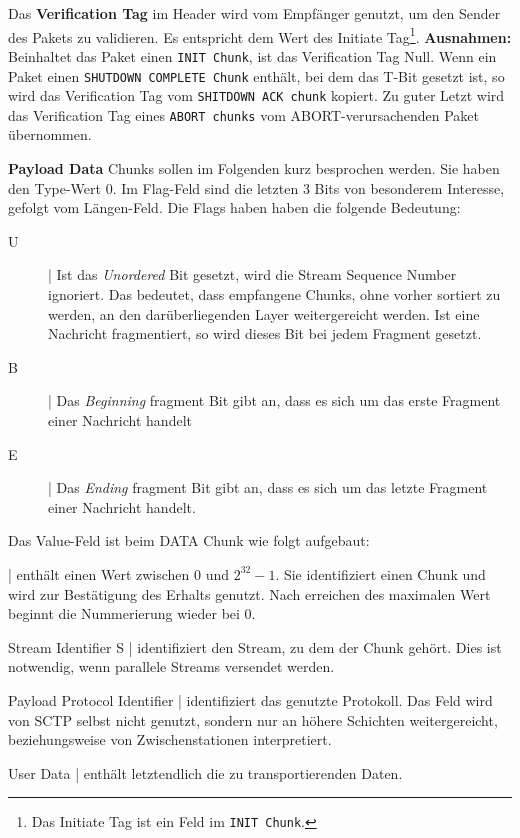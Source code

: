 \documentclass{article} %
\begin{document}
Das \textbf{Verification Tag} im Header wird vom Empfänger genutzt, um den Sender des Pakets zu validieren.
Es entspricht dem Wert des Initiate Tag\footnote{Das Initiate Tag ist ein Feld im \texttt{INIT Chunk}.}.
\textbf{Ausnahmen:} Beinhaltet das Paket einen \texttt{INIT Chunk}, ist das Verification Tag Null.
Wenn ein Paket einen \texttt{SHUTDOWN COMPLETE Chunk} enthält, bei dem das T-Bit gesetzt ist, so wird das Verification Tag vom \texttt{SHITDOWN ACK chunk} kopiert.
Zu guter Letzt wird das Verification Tag eines \texttt{ABORT chunks} vom ABORT-verursachenden Paket übernommen.

\textbf{Payload Data} Chunks sollen im Folgenden kurz besprochen werden.
Sie haben den Type-Wert 0.
Im Flag-Feld sind die letzten 3 Bits von besonderem Interesse, gefolgt vom Längen-Feld.
Die Flags haben haben die folgende Bedeutung:
\begin{description}
	\item[U] | Ist das \emph{Unordered} Bit gesetzt, wird die Stream Sequence Number ignoriert.
	Das bedeutet, dass empfangene Chunks, ohne vorher sortiert zu werden, an den darüberliegenden Layer weitergereicht werden.
	Ist eine Nachricht fragmentiert, so wird dieses Bit bei jedem Fragment gesetzt.
	\item[B] | Das \emph{Beginning} fragment Bit gibt an, dass es sich um das erste Fragment einer Nachricht handelt
	\item[E] | Das \emph{Ending} fragment Bit gibt an, dass es sich um das letzte Fragment einer Nachricht handelt.
\end{description}
Das Value-Feld ist beim DATA Chunk wie folgt aufgebaut:
\begin{description}
	\item[Transmission Sequence Number (TSN)] | enthält einen Wert zwischen 0 und $2^{32}-1$.
	Sie identifiziert einen Chunk und wird zur Bestätigung des Erhalts genutzt.
	Nach erreichen des maximalen Wert beginnt die Nummerierung wieder bei 0.
	\item {Stream Identifier S} | identifiziert den Stream, zu dem der Chunk gehört.
	Dies ist notwendig, wenn parallele Streams versendet werden.
	\item {Payload Protocol Identifier} | identifiziert das genutzte Protokoll.
	Das Feld wird von SCTP selbst nicht genutzt, sondern nur an höhere Schichten weitergereicht, beziehungsweise von Zwischenstationen interpretiert.
	\item {User Data} | enthält letztendlich die zu transportierenden Daten.
\end{description}
\end{document}
